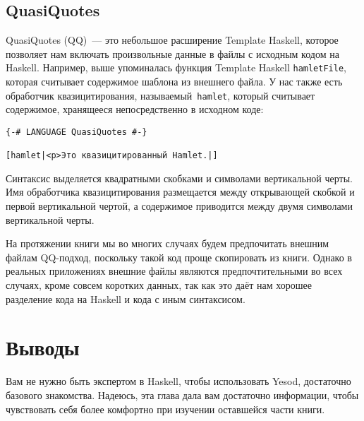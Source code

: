\subsection{QuasiQuotes}

QuasiQuotes (QQ)~--- это небольшое расширение Template Haskell, которое
позволяет нам включать произвольные данные в файлы с исходным кодом на Haskell.
Например, выше упоминалась функция Template Haskell \lstinline'hamletFile',
которая считывает содержимое шаблона из внешнего файла. У нас также есть
обработчик квазицитирования, называемый~\lstinline'hamlet', который считывает
содержимое, хранящееся непосредственно в исходном коде:

\begin{lstlisting}
{-# LANGUAGE QuasiQuotes #-}

[hamlet|<p>Это квазицитированный Hamlet.|]
\end{lstlisting}

Синтаксис выделяется квадратными скобками и символами вертикальной черты. Имя
обработчика квазицитирования размещается между открывающей скобкой и первой
вертикальной чертой, а содержимое приводится между двумя символами вертикальной
черты.

На протяжении книги мы во многих случаях будем предпочитать внешним файлам
QQ-подход, поскольку такой код проще скопировать из книги. Однако в реальных
приложениях внешние файлы являются предпочтительными во всех случаях, кроме
совсем коротких данных, так как это даёт нам хорошее разделение кода на Haskell
и кода с иным синтаксисом.

\section{Выводы}

Вам не нужно быть экспертом в Haskell, чтобы использовать Yesod, достаточно
базового знакомства. Надеюсь, эта глава дала вам достаточно информации, чтобы
чувствовать себя более комфортно при изучении оставшейся части книги.
